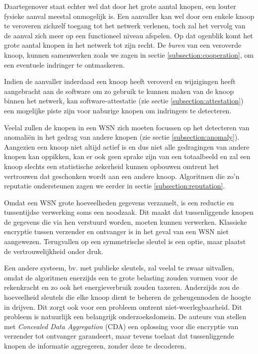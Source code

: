 Daartegenover staat echter wel dat door het grote aantal knopen, een louter
fysieke aanval meestal onmogelijk is. Een aanvaller kan wel door een enkele
knoop te veroveren zichzelf toegang tot het netwerk verlenen, toch zal het
vervolg van de aanval zich meer op een functioneel niveau afspelen. Op dat
ogenblik komt het grote aantal knopen in het netwerk tot zijn recht. De
\emph{buren} van een veroverde knoop, kunnen samenwerken zoals we zagen in
sectie \ref{subsection:cooperation}, om een eventuele indringer te ontmaskeren.

Indien de aanvaller inderdaad een knoop heeft veroverd en wijzigingen heeft
aangebracht aan de software om zo gebruik te kunnen maken van de knoop binnen
het netwerk, kan software-attestatie (zie sectie \ref{subsection:attestation})
een mogelijke piste zijn voor naburige knopen om indringers te detecteren.

Veelal zullen de knopen in een WSN zich moeten focussen op het detecteren van
anomali\"en in het gedrag van andere knopen (zie sectie
\ref{subsection:anomaly}). Aangezien een knoop niet altijd actief is en dus
niet alle gedragingen van andere knopen kan oppikken, kan er ook geen sprake
zijn van een totaalbeeld en zal een knoop slechts een statistische zekerheid
kunnen opbouwen omtrent het vertrouwen dat geschonken wordt aan een andere
knoop. Algoritmen die zo'n reputatie ondersteunen zagen we eerder in sectie
\ref{subsection:reputation}.

Omdat een WSN grote hoeveelheden gegevens verzamelt, is een reductie en
tussentijdse verwerking soms een noodzaak. Dit maakt dat tussenliggende knopen
de gegevens die via hen verstuurd worden, moeten kunnen verwerken. Klassieke
encryptie tussen verzender en ontvanger is in het geval van een WSN niet
aangewezen. Terugvallen op een symmetrische sleutel is een optie, maar plaatst
de vertrouwelijkheid onder druk.

Een andere systeem, bv. met publieke sleutels, zal veelal te zwaar uitvallen,
omdat de algoritmen enerzijds een te grote belasting zouden vormen voor de
rekenkracht en zo ook het energieverbruik zouden taxeren. Anderzijds zou de
hoeveelheid sleutels die elke knoop dient te beheren de geheugennoden de hoogte
in drijven. Dit zorgt ook voor een probleem omtrent niet-weerlegbaarheid. Dit
probleem is natuurlijk een belangrijk onderzoeksdomein. De auteurs van
\citep{girao2005cda} stellen met \emph{Concealed Data Aggregation} (CDA) een
oplossing voor die encryptie van verzender tot ontvanger garandeert, maar
tevens toelaat dat tussenliggende knopen de informatie aggregeren, zonder deze
te decoderen.

